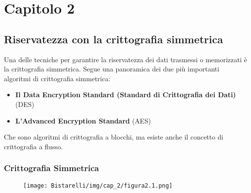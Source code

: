 \chapter{Capitolo 2}
\section{Riservatezza con la crittografia simmetrica}
Una delle tecniche per garantire la riservatezza dei dati trasmessi o memorizzati è la crittografia simmetrica.
Segue una panoramica dei due più importanti algoritmi di crittografia simmetrica: 

\begin{itemize}
    \centering
    \item \textbf{Il Data Encryption Standard (Standard di Crittografia dei Dati)} (DES)
    
    \item \textbf{L'Advanced Encryption Standard} (AES) 
\end{itemize}

Che sono algoritmi di crittografia a blocchi, ma esiste anche il concetto di crittografia a flusso.

\newpage
\subsection{Crittografia Simmetrica}

\begin{figure}[H]
	\centering
    \texttt{[image: Bistarelli/img/cap\_2/figura2.1.png]}
\end{figure}

